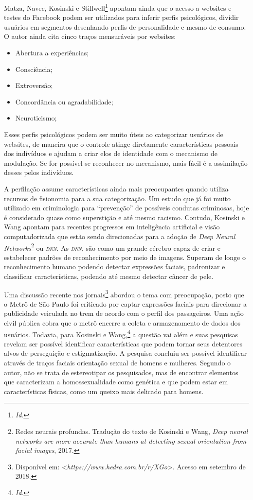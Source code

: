 Matza, Navec, Kosinski e Stillwell\footnote{\textit{Id}.} apontam ainda que o acesso a
websites e testes do Facebook podem ser utilizados para inferir perfis
psicológicos, dividir usuários em segmentos desenhando perfis de
personalidade e mesmo de consumo. O autor ainda cita cinco traços
mensuráveis por websites:

\begin{itemize}
\item
  Abertura a experiências;
\item
  Consciência;
\item
  Extroversão;
\item
  Concordância ou agradabilidade;
\item
  Neuroticismo;
\end{itemize}

Esses perfis psicológicos podem ser muito úteis ao categorizar usuários
de websites, de maneira que o controle atinge diretamente
características pessoais dos indivíduos e ajudam a criar elos de
identidade com o mecanismo de modulação. Se for possível se reconhecer
no mecanismo, mais fácil é a assimilação desses pelos indivíduos.

A perfilação assume características ainda mais preocupantes quando
utiliza recursos de fisionomia para a sua categorização. Um estudo que
já foi muito utilizado em criminologia para ``prevenção'' de possíveis
condutas criminosas, hoje é considerado quase como superstição e até
mesmo racismo. Contudo, Kosinski e Wang apontam para recentes
progressos em inteligência artificial e visão computadorizada que estão
sendo direcionadas para a adoção de \emph{Deep Neural
Networks}\footnote{Redes neurais profundas. Tradução do texto de
  Kosinski e Wang, \emph{Deep neural networks are more accurate than humans at detecting sexual orientation from facial images}, 2017.} ou \emph{\textsc{dnn}}. As \emph{\textsc{dnn}}, são como um
grande cérebro capaz de criar e estabelecer padrões de reconhecimento
por meio de imagens. Superam de longe o reconhecimento humano podendo
detectar expressões faciais, padronizar e classificar características,
podendo até mesmo detectar câncer de pele.

Uma discussão recente nos jornais\footnote{Disponível em:
\textless{}\emph{https://www.hedra.com.br/r/XGo}\textgreater{}. Acesso em setembro de 2018.} abordou o tema com preocupação, posto que
o Metrô de São Paulo foi criticado por captar expressões faciais para
direcionar a publicidade veiculada no trem de acordo com o perfil dos
passageiros. Uma ação civil pública cobra que o metrô encerre a coleta e
armazenamento de dados dos usuários. Todavia, para Kosinski e Wang,\footnote{\textit{Id}.}
a questão vai além e suas pesquisas revelam ser possível identificar
características que podem tornar seus detentores alvos de perseguição e
estigmatização. A pesquisa concluiu ser possível identificar através de
traços faciais orientação sexual de homens e mulheres. Segundo o autor,
não se trata de estereotipar os pesquisados, mas de encontrar elementos
que caracterizam a homossexualidade como genética e que podem estar em
características físicas, como um queixo mais delicado para homens.

